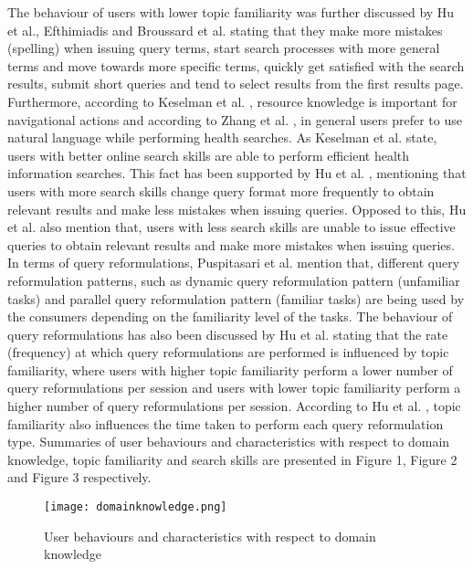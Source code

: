 \documentclass[]{article}
\begin{document}
The behaviour of users with lower topic familiarity was further discussed by Hu et al., Efthimiadis and Broussard et al. \cite{hu2013effects,efthimiadis2009students,broussard2013seeking} stating that they make more mistakes (spelling) when issuing query terms, start search processes with more general terms and move towards more specific terms, quickly get satisfied with the search results, submit short queries and tend to select results from the first results page. Furthermore, according to Keselman et al. \cite{keselman2008consumer}, resource knowledge is important for navigational actions and according to Zhang et al. \cite{zhang2012health}, in general users prefer to use natural language while performing health searches. As Keselman et al. \cite{keselman2008consumer} state, users with better online search skills are able to perform efficient health information searches. This fact has been supported by Hu et al. \cite{hu2013effects}, mentioning that users with more search skills change query format more frequently to obtain relevant results and make less mistakes when issuing queries. Opposed to this, Hu et al. \cite{hu2013effects} also mention that, users with less search skills are unable to issue effective queries to obtain relevant results and make more mistakes when issuing queries. In terms of query reformulations, Puspitasari et al. \cite{puspitasari2013characterizing} mention that, different query reformulation patterns, such as dynamic query reformulation pattern (unfamiliar tasks) and parallel query reformulation pattern (familiar tasks) are being used by the consumers depending on the familiarity level of the tasks. The behaviour of query reformulations has also been discussed by Hu et al. \cite{hu2013effects} stating that the rate (frequency) at which query reformulations are performed is influenced by topic familiarity, where users with higher topic familiarity perform a lower number of query reformulations per session and users with lower topic familiarity perform a higher number of query reformulations per session. According to Hu et al. \cite{hu2013effects}, topic familiarity also influences the time taken to perform each query reformulation type. Summaries of user behaviours and characteristics with respect to domain knowledge, topic familiarity and search skills are presented in Figure 1, Figure 2 and Figure 3 respectively.   

\begin{figure}[t!]
	\texttt{[image: domainknowledge.png]}
	\caption{User behaviours and characteristics with respect to domain knowledge\label{fig1}}
\end{figure}  
\end{document}
